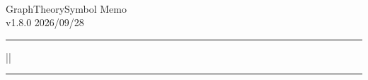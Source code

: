 \documentclass[11pt]{article}
\begin{document}
\ \vspace{2cm}
\begin{center}
{\Huge GraphTheorySymbol Memo}\\
{\huge v1.8.0 2026/09/28}
\end{center}
\vspace{2cm}

\MakeShortVerb{\|}



\bigskip




\if{}\medskip\fi
\hrule
\if{}\medskip\fi
{}
||





\bigskip
\hrule

\bigskip

\end{document}
